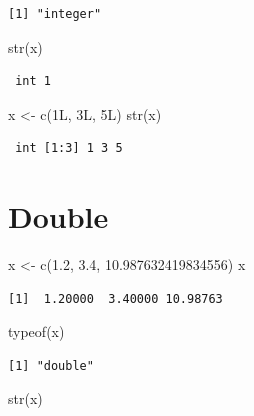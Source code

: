 \documentclass[
]{book}
\newenvironment{Shaded}{\begin{snugshade}}{\end{snugshade}}
\newcommand{\FloatTok}[1]{\textcolor[rgb]{0.00,0.00,0.81}{#1}}
\newcommand{\FunctionTok}[1]{\textcolor[rgb]{0.00,0.00,0.00}{#1}}
\newcommand{\NormalTok}[1]{#1}
\newcommand{\OtherTok}[1]{\textcolor[rgb]{0.56,0.35,0.01}{#1}}
\begin{document}
\begin{verbatim}
[1] "integer"
\end{verbatim}

\begin{Shaded}
\begin{Highlighting}[]
\FunctionTok{str}\NormalTok{(x)}
\end{Highlighting}
\end{Shaded}

\begin{verbatim}
 int 1
\end{verbatim}

\begin{Shaded}
\begin{Highlighting}[]
\NormalTok{x }\OtherTok{\textless{}{-}} \FunctionTok{c}\NormalTok{(1L, 3L, 5L)}
\FunctionTok{str}\NormalTok{(x)}
\end{Highlighting}
\end{Shaded}

\begin{verbatim}
 int [1:3] 1 3 5
\end{verbatim}

\hypertarget{double}{%
\section{Double}\label{double}}

\begin{Shaded}
\begin{Highlighting}[]
\NormalTok{x }\OtherTok{\textless{}{-}} \FunctionTok{c}\NormalTok{(}\FloatTok{1.2}\NormalTok{, }\FloatTok{3.4}\NormalTok{, }\FloatTok{10.987632419834556}\NormalTok{)}
\NormalTok{x}
\end{Highlighting}
\end{Shaded}

\begin{verbatim}
[1]  1.20000  3.40000 10.98763
\end{verbatim}

\begin{Shaded}
\begin{Highlighting}[]
\FunctionTok{typeof}\NormalTok{(x)}
\end{Highlighting}
\end{Shaded}

\begin{verbatim}
[1] "double"
\end{verbatim}

\begin{Shaded}
\begin{Highlighting}[]
\FunctionTok{str}\NormalTok{(x)}
\end{Highlighting}
\end{Shaded}
\end{document}
